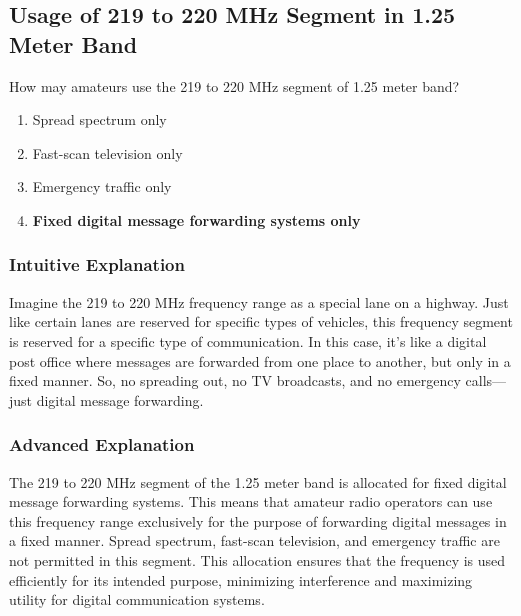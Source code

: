 \subsection{Usage of 219 to 220 MHz Segment in 1.25 Meter Band}
\label{T1B05}

\begin{tcolorbox}[colback=gray!10!white,colframe=black!75!black,title=T1B05]
How may amateurs use the 219 to 220 MHz segment of 1.25 meter band?
\begin{enumerate}[label=\Alph*),noitemsep]
    \item Spread spectrum only
    \item Fast-scan television only
    \item Emergency traffic only
    \item \textbf{Fixed digital message forwarding systems only}
\end{enumerate}
\end{tcolorbox}

\subsubsection{Intuitive Explanation}
Imagine the 219 to 220 MHz frequency range as a special lane on a highway. Just like certain lanes are reserved for specific types of vehicles, this frequency segment is reserved for a specific type of communication. In this case, it's like a digital post office where messages are forwarded from one place to another, but only in a fixed manner. So, no spreading out, no TV broadcasts, and no emergency calls—just digital message forwarding.

\subsubsection{Advanced Explanation}
The 219 to 220 MHz segment of the 1.25 meter band is allocated for fixed digital message forwarding systems. This means that amateur radio operators can use this frequency range exclusively for the purpose of forwarding digital messages in a fixed manner. Spread spectrum, fast-scan television, and emergency traffic are not permitted in this segment. This allocation ensures that the frequency is used efficiently for its intended purpose, minimizing interference and maximizing utility for digital communication systems.
